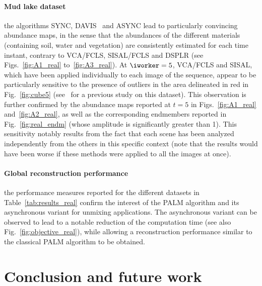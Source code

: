 \documentclass[journal,final,letterpaper,twoside,twocolumn]{IEEEtran}
\begin{document}
	   \paragraph{Mud lake dataset}
the algorithms SYNC, DAVIS~\cite{Davis2016} and ASYNC lead to particularly convincing abundance maps, in the sense that the abundances of the different materials (containing soil, water and vegetation) are consistently estimated for each time instant, contrary to VCA/FCLS, SISAL/FCLS and DSPLR (see Figs.~\ref{fig:A1_real} to~\ref{fig:A3_real}). At $\iworker = 5$, VCA/FCLS and SISAL, which have been applied  individually to each image of the sequence, appear to be particularly sensitive to the presence of outliers in the area delineated in red in Fig.~\ref{fig:cube5} (see~\cite{Thouvenin2015b} for a previous study on this dataset). This observation is further confirmed by the abundance maps reported at $t = 5$ in Figs.~\ref{fig:A1_real} and~\ref{fig:A2_real}, as well as the corresponding endmembers reported in Fig.~\ref{fig:real_endm} (whose amplitude is significantly greater than 1). This sensitivity notably results from the fact that each scene has been analyzed independently from the others in this specific context (note that the results would have been worse if these methods were applied to all the images at once).


	   \paragraph{Global reconstruction performance}
the performance measures reported for the different datasets in Table~\ref{tab:results_real} confirm the interest of the PALM algorithm and its asynchronous variant for unmixing applications. The asynchronous variant can be observed to lead to a notable reduction of the computation time (see also Fig.~\ref{fig:objective_real}), while allowing a reconstruction performance similar to the classical PALM algorithm to be obtained.


\section{Conclusion and future work} \label{sec:conclusion}
\end{document}
